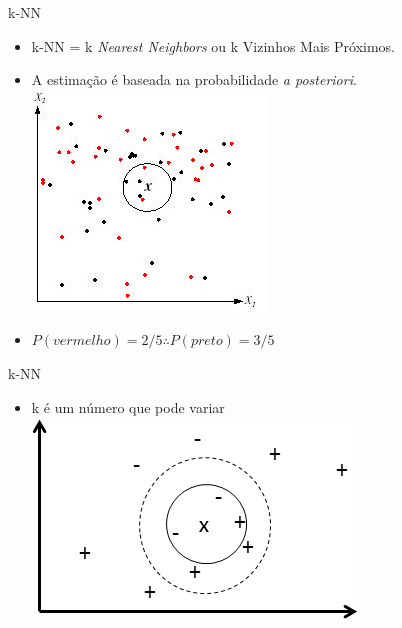 \documentclass{libs/ufc_format}
\begin{document}
\begin{frame}{k-NN}
    \begin{itemize}
        \justifying
        \item k-NN = k \textit{Nearest Neighbors} ou k Vizinhos Mais Próximos.
        \item A estimação é baseada na probabilidade \textit{a posteriori}.\\
        \includegraphics[scale=0.75]{media/knn}
        \item<2-> $P(vermelho) = 2/5 \therefore P(preto) = 3/5$
    \end{itemize}
\end{frame}

\begin{frame}{k-NN}
    \begin{itemize}
        \item k é um número que pode variar\\
        \includegraphics[scale=1]{media/knn_desafio}
    \end{itemize}
\end{frame}
\end{document}
